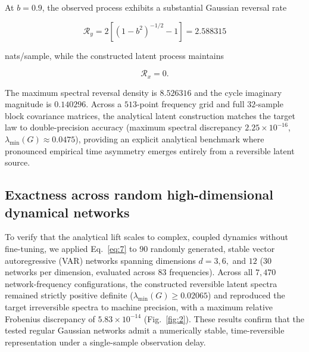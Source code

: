 \documentclass[aps,pre,reprint,amsmath,amssymb,superscriptaddress]{revtex4-2}
\begin{document}
At $b=0.9$, the observed process exhibits a substantial Gaussian reversal rate

\begin{equation}\label{eq:11}
\boxed{
\mathcal R_y
=
2\left[
(1-b^2)^{-1/2}-1
\right]
=
2.588315
}
\end{equation}

nats/sample, while the constructed latent process maintains

\begin{equation}\label{eq:12}
\boxed{\mathcal R_x=0.}
\end{equation}

The maximum spectral reversal density is $8.526316$ and the cycle imaginary magnitude is $0.140296$. Across a $513$-point frequency grid and full $32$-sample block covariance matrices, the analytical latent construction matches the target law to double-precision accuracy (maximum spectral discrepancy $2.25 \times 10^{-16}$, $\lambda_{\min}(G) \approx 0.0475$), providing an explicit analytical benchmark where pronounced empirical time asymmetry emerges entirely from a reversible latent source.

\subsection{Exactness across random high-dimensional dynamical networks}

To verify that the analytical lift scales to complex, coupled dynamics without fine-tuning, we applied Eq.~\eqref{eq:7} to $90$ randomly generated, stable vector autoregressive (VAR) networks spanning dimensions $d = 3, 6,$ and $12$ ($30$ networks per dimension, evaluated across $83$ frequencies). Across all $7,470$ network-frequency configurations, the constructed reversible latent spectra remained strictly positive definite ($\lambda_{\min}(G) \ge 0.02065$) and reproduced the target irreversible spectra to machine precision, with a maximum relative Frobenius discrepancy of $5.83 \times 10^{-14}$ (Fig.~\ref{fig:2}). These results confirm that the tested regular Gaussian networks admit a numerically stable, time-reversible representation under a single-sample observation delay.
\end{document}
